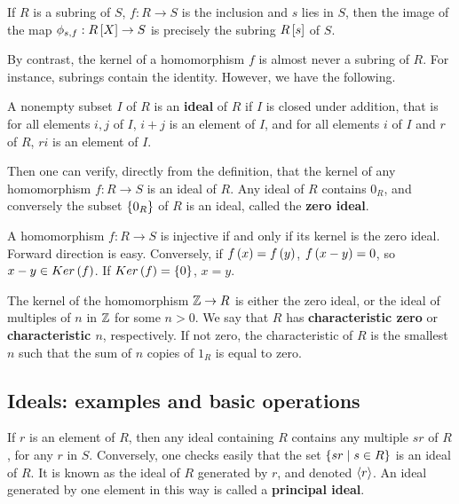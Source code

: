 \begin{example*}
If $ R $ is a subring of $ S $, $ f : R \to S $ is the inclusion and $ s $ lies in $ S $, then the image of the map $ \phi_{s, f} : R\sb{X} \to S $ is precisely the subring $ R\sb{s} $ of $ S $.
\end{example*}

By contrast, the kernel of a homomorphism $ f $ is almost never a subring of $ R $. For instance, subrings contain the identity. However, we have the following.


\begin{definition}
A nonempty subset $ I $ of $ R $ is an \textbf{ideal} of $ R $ if $ I $ is closed under addition, that is for all elements $ i, j $ of $ I $, $ i + j $ is an element of $ I $, and for all elements $ i $ of $ I $ and $ r $ of $ R $, $ ri $ is an element of $ I $.
\end{definition}

Then one can verify, directly from the definition, that the kernel of any homomorphism $ f : R \to S $ is an ideal of $ R $. Any ideal of $ R $ contains $ 0_R $, and conversely the subset $ \cb{0_R} $ of $ R $ is an ideal, called the \textbf{zero ideal}.

\begin{note*}
A homomorphism $ f : R \to S $ is injective if and only if its kernel is the zero ideal. Forward direction is easy. Conversely, if $ f\rb{x} = f\rb{y} $, $ f\rb{x - y} = 0 $, so $ x - y \in Ker\rb{f} $. If $ Ker\rb{f} = \cb{0} $, $ x = y $.
\end{note*}

The kernel of the homomorphism $ \Z \to R $ is either the zero ideal, or the ideal of multiples of $ n $ in $ \Z $ for some $ n > 0 $. We say that $ R $ has \textbf{characteristic zero} or \textbf{characteristic $ n $}, respectively. If not zero, the characteristic of $ R $ is the smallest $ n $ such that the sum of $ n $ copies of $ 1_R $ is equal to zero.

\pagebreak

\subsection{Ideals: examples and basic operations}

If $ r $ is an element of $ R $, then any ideal containing $ R $ contains any multiple $ sr $ of $ R $, for any $ r $ in $ S $. Conversely, one checks easily that the set $ \cb{sr \mid s \in R} $ is an ideal of $ R $. It is known as the ideal of $ R $ generated by $ r $, and denoted $ \ab{r} $. An ideal generated by one element in this way is called a \textbf{principal ideal}.

